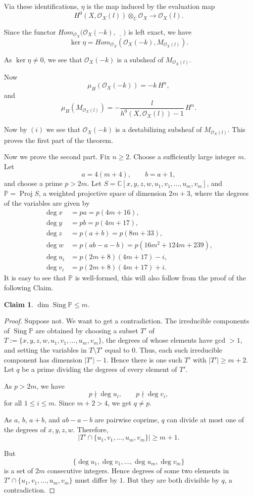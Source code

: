 \documentclass[11pt,letterpaper]{amsart}
\newtheorem{claim}[lemma]{Claim}
\begin{document}
Via these identifications, $\eta$ is the map
induced by the evaluation map
\[
H^0(X,\mathcal O_X(l))
\otimes_{\mathbb C}\mathcal O_X
\longrightarrow
\mathcal O_X(l).
\]

Since the functor $Hom_{\mathcal{O}_X}\bigl(\mathcal{O}_X(-k),\,\underline{\phantom{X}}\bigr)$ is left exact, we have $$
\ker\eta
= Hom_{\mathcal O_X}
(\mathcal O_X(-k),M_{\mathcal O_X(l)}).
$$

As $\ker\eta\neq0$, we see that $\mathcal O_X(-k)$ is a subsheaf of
$M_{\mathcal O_X(l)}$.

Now
\[
\mu_H(\mathcal O_X(-k))
=
-k\,H^n,
\]
and
\[
\mu_H(M_{\mathcal O_X(l)})
=
-\frac{l}{h^0(X,\mathcal O_X(l))-1}\,H^n.
\]

Now by $(i)$
we see that $\mathcal O_X(-k)$ is a destabilizing subsheaf of
$M_{\mathcal O_X(l)}$. This proves the first part of the theorem.

Now we prove the second part. Fix $n\ge2$. Choose a sufficiently large integer $m$. Let
\[
a=4(m+4),\qquad
b=a+1,
\]
and choose a prime $p>2m$. Let $S=\mathbb C[x,y,z,w,u_1,v_1,\ldots,u_m,v_m]$, and $\mathbb P=\operatorname{Proj} S$, a weighted projective space
of dimension $2m+3$, where the degrees of the variables are given by
\begin{align*}
\deg x
&=pa
=p(4m+16),\\
\deg y
&=pb
=p(4m+17),\\
\deg z
&=p(a+b)
=p(8m+33),\\
\deg w
&=p(ab-a-b)
=p(16m^2+124m+239),\\
\deg u_i
&=p(2m+8)(4m+17)-i,\\
\deg v_i
&=p(2m+8)(4m+17)+i.
\end{align*}
It is easy to see that $\mathbb P$ is well-formed, this will also follow from the proof of the following Claim.
\begin{claim}\label{sing}
$\dim\operatorname{Sing}\mathbb P\le m$.
\end{claim}

\begin{proof}
Suppose not. We want to get a contradiction.
The irreducible components of $\operatorname{Sing}\mathbb P$ are obtained by
choosing a subset $T'$ of $T:=\{x,y,z,w,u_1,v_1,\ldots,u_m,v_m\}$,
the degrees of whose elements have gcd $>1$, and setting the
variables in $T\setminus T'$ equal to $0$. Thus, each such irreducible
component has dimension $|T'|-1$. Hence there is one such $T'$ with $|T'|\ge m+2.$
Let $q$ be a prime dividing the degrees of every element of $T'$.

As $p>2m$, we have
\[
p\nmid\deg u_i,\qquad
p\nmid\deg v_i,
\]
for all $1\le i\le m$. Since $m+2>4$, we get $q\neq p$.

As $a$, $b$, $a+b$, and $ab-a-b$ are pairwise coprime, $q$ can divide at
most one of the degrees of $x,y,z,w$. Therefore,
\[
\left|T'\cap
\{u_1,v_1,\ldots,u_m,v_m\}\right|
\ge m+1.
\]

But
\[
\{\deg u_1,\deg v_1,\ldots,\deg u_m,\deg v_m\}
\]
is a set of $2m$ consecutive integers. Hence degrees of some two elements in $
T'\cap\{u_1,v_1,\ldots,u_m,v_m\}$
must differ by $1$. But they are both divisible by $q$, a contradiction.
\end{proof}
\end{document}
